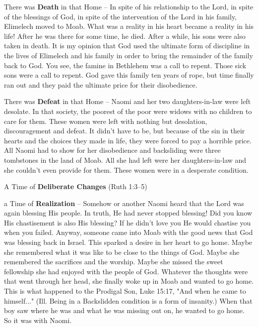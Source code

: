\begin{compactenum}[I.][7]
\begin{compactenum}[A.][7]
     	\item There was \textbf{Death} in that Home -- In spite of his relationship to the Lord, in spite of the blessings of God, in spite of the intervention of the Lord in his family, Elimelech moved to Moab. What was a reality in his heart became a reality in his life! After he was there for some time, he died. After a while, his sons were also taken in death. It is my opinion that God used the ultimate form of discipline in the lives of Elimelech and his family in order to bring the remainder of the family back to God. You see, the famine in Bethlehem was a call to repent. Those sick sons were a call to repent. God gave this family ten years of rope, but time finally ran out and they paid the ultimate price for their disobedience.
    	\item There was \textbf{Defeat} in that Home -- Naomi and her two daughters-in-law were left desolate. In that society, the poorest of the poor were widows with no children to care for them. These women were left with nothing but desolation, discouragement and defeat. It didn't have to be, but because of the sin in their hearts and the choices they made in life, they were forced to pay a horrible price. All Naomi had to show for her disobedience and backsliding were three tombstones in the land of Moab. All she had left were her daughters-in-law and she couldn't even provide for them. These women were in a desperate condition.
   \end{compactenum}
        \item A Time of \textbf{Deliberate Changes} (Ruth 1:3--5)
    \begin{compactenum}[A.][7]
    	\item a Time of \textbf{Realization}  -- Somehow or another Naomi heard that the Lord was again blessing His people. In truth, He had never stopped blessing! Did you know His chastisement is also His blessing? If he didn't love you He would chastise you when you failed. Anyway, someone came into Moab with the good news that God was blessing back in Israel. This sparked a desire in her heart to go home. Maybe she remembered what it was like to be close to the things of God. Maybe she remembered the sacrifices and the worship. Maybe she missed the sweet fellowship she had enjoyed with the people of God. Whatever the thoughts were that went through her head, she finally woke up in Moab and wanted to go home. This is what happened to the Prodigal Son, Luke 15:17, "And when he came to himself..." (Ill. Being in a Backslidden condition is a form of insanity.) When that boy saw where he was and what he was missing out on, he wanted to go home. So it was with Naomi.

\end{compactenum}
\end{compactenum}
